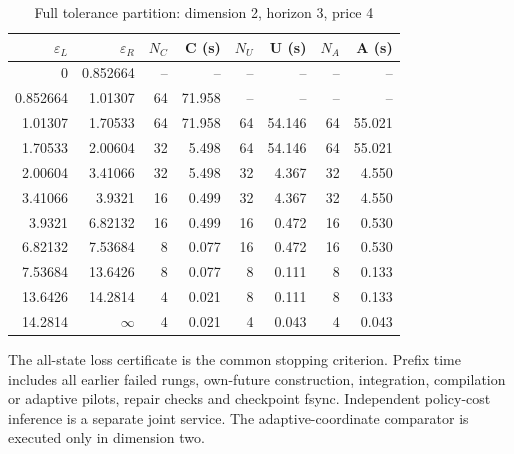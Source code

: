 \begin{table}[htbp]
\centering
\caption{Full tolerance partition: dimension 2, horizon 3, price 4}\label{tab:frontier-full48-2-3-4}
\footnotesize
\begin{tabular}{rrrrrrrr}
\toprule
$\varepsilon_L$ & $\varepsilon_R$ & $N_C$ & C (s) & $N_U$ & U (s) & $N_A$ & A (s)\\
\midrule
0 & 0.852664 & -- & -- & -- & -- & -- & -- \\
0.852664 & 1.01307 & 64 & 71.958 & -- & -- & -- & -- \\
1.01307 & 1.70533 & 64 & 71.958 & 64 & 54.146 & 64 & 55.021 \\
1.70533 & 2.00604 & 32 & 5.498 & 64 & 54.146 & 64 & 55.021 \\
2.00604 & 3.41066 & 32 & 5.498 & 32 & 4.367 & 32 & 4.550 \\
3.41066 & 3.9321 & 16 & 0.499 & 32 & 4.367 & 32 & 4.550 \\
3.9321 & 6.82132 & 16 & 0.499 & 16 & 0.472 & 16 & 0.530 \\
6.82132 & 7.53684 & 8 & 0.077 & 16 & 0.472 & 16 & 0.530 \\
7.53684 & 13.6426 & 8 & 0.077 & 8 & 0.111 & 8 & 0.133 \\
13.6426 & 14.2814 & 4 & 0.021 & 8 & 0.111 & 8 & 0.133 \\
14.2814 & $\infty$ & 4 & 0.021 & 4 & 0.043 & 4 & 0.043 \\
\bottomrule
\end{tabular}
\begin{minipage}{0.97\linewidth}\footnotesize\vspace{3pt}
The all-state loss certificate is the common stopping criterion. Prefix time includes all earlier failed rungs, own-future construction, integration, compilation or adaptive pilots, repair checks and checkpoint fsync. Independent policy-cost inference is a separate joint service. The adaptive-coordinate comparator is executed only in dimension two.
\end{minipage}
\end{table}
